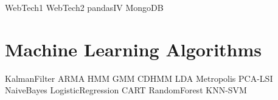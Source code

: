 \documentclass[nociteref]{SIAM-GH-book}
\begin{document}
{WebTech1}
{WebTech2}
{pandasIV}
{MongoDB}

\part{Machine Learning Algorithms}
{KalmanFilter}
{ARMA}
{HMM}
{GMM}
{CDHMM}
{LDA}
{Metropolis}
{PCA-LSI}
{NaiveBayes}
{LogisticRegression}
{CART}
{RandomForest}
{KNN-SVM}
\end{document}

